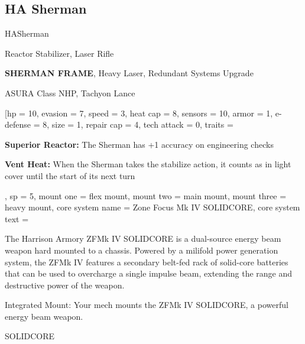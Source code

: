 \subsection{HA Sherman}

\begin{mech}{HA}{Sherman}


\begin{license}
\item Reactor Stabilizer, Laser Rifle
\item \textbf{SHERMAN FRAME}, Heavy Laser, Redundant Systems Upgrade
\item ASURA Class NHP, Tachyon Lance
\end{license}

\frameBox
[hp = 10,
evasion = 7,
speed = 3,
heat cap = 8,
sensors = 10,
armor = 1,
e-defense = 8,
size = 1,
repair cap = 4,
tech attack = 0,
traits = {\textbf{Superior Reactor:} The Sherman has +1 accuracy on engineering checks

\textbf{Vent Heat:} When the Sherman takes the stabilize action, it counts as in light cover until the start of its next turn},
sp = 5,
mount one = flex mount,
mount two = main mount,
mount three = heavy mount,
core system name = Zone Focus Mk IV  SOLIDCORE,
core system text ={The Harrison Armory ZFMk IV SOLIDCORE is a dual-source energy beam weapon hard mounted to a chassis. Powered by a milifold power generation system, the ZFMk IV features a secondary belt-fed rack of solid-core batteries that can be used to overcharge a single impulse beam, extending the range and destructive power of the weapon.

Integrated Mount: Your mech mounts the ZFMk IV SOLIDCORE, a powerful energy beam weapon.

SOLIDCORE

}
\end{mech}
